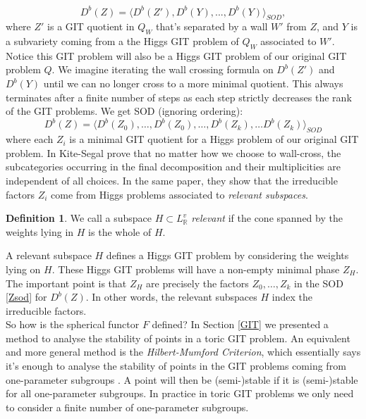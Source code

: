 \documentclass[oneside,reqno]{amsart}
\theoremstyle{definition}
\newtheorem{definition}{Definition}[section]
\theoremstyle{definition}
\theoremstyle{definition}
\theoremstyle{definition}
\begin{document}
$$
D^b(Z) = \langle D^b(Z'), D^b(Y),...,D^b(Y) \rangle_{SOD},
$$
where $Z'$ is a GIT quotient in $Q_W$ that's separated by a wall $W'$ from $Z$, and $Y$ is a subvariety coming from a the Higgs GIT problem of $Q_W$ associated to $W'$. Notice this GIT problem will also be a Higgs GIT problem of our original GIT problem $Q$. We imagine iterating the wall crossing formula on $D^b(Z')$ and $D^b(Y)$ until we can no longer cross to a more minimal quotient. This always terminates after a finite number of steps as each step strictly decreases the rank of the GIT problems. We get SOD (ignoring ordering):
\begin{equation}
    \label{Zsod}
    D^b(Z) = \langle D^b(Z_0), \dots, D^b(Z_0), \dots, D^b(Z_k), \dots D^b(Z_k)\rangle_{SOD}
\end{equation}
where each $Z_i$ is a minimal GIT quotient for a Higgs problem of our original GIT problem. In \cite{kite2022discriminants} Kite-Segal prove that no matter how we choose to wall-cross, the subcategories occurring in the final decomposition and their multiplicities are independent of all choices. In the same paper, they show that the irreducible factors $Z_i$ come from Higgs problems associated to \textit{relevant subspaces}.
\begin{definition}
    We call a subspace $H \subset L_{\mathbb{R}}^v$ \textit{relevant} if the cone spanned by the weights lying in $H$ is the whole of $H$.
\end{definition}
A relevant subspace $H$ defines a Higgs GIT problem by considering the weights lying on $H$. These Higgs GIT problems will have a non-empty minimal phase $Z_H$. The important point is that $Z_H$ are precisely the factors $Z_0, \dots, Z_k$ in the SOD \eqref{Zsod} for $D^b(Z)$. In other words, the relevant subspaces $H$ index the irreducible factors.  \\
\newline
So how is the spherical functor $F$ defined? In Section \ref{GIT} we presented a method to analyse the stability of points in a toric GIT problem. An equivalent and more general method is the \textit{Hilbert-Mumford Criterion}, which essentially says it's enough to analyse the stability of points in the GIT problems coming from one-parameter subgroups \cite{mumford}. A point will then be (semi-)stable if it is (semi-)stable for all one-parameter subgroups. In practice in toric GIT problems we only need to consider a finite number of one-parameter subgroups. \\
\newline
\end{document}
